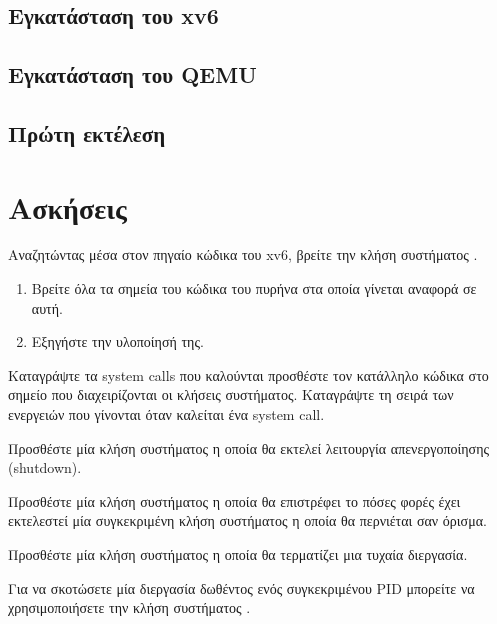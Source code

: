 \documentclass[18pt]{extarticle}
\begin{document}
\subsection{Εγκατάσταση του xv6}

\subsection{Εγκατάσταση του QEMU}

\subsection{Πρώτη εκτέλεση}

\section{Ασκήσεις}

\begin{question}
    Αναζητώντας μέσα στον πηγαίο κώδικα του xv6, βρείτε την 
    κλήση συστήματος .

    \begin{enumerate}
        \item Βρείτε όλα τα σημεία του κώδικα του πυρήνα στα οποία γίνεται αναφορά σε αυτή.
        \item Εξηγήστε την υλοποίησή της.
    \end{enumerate}
\end{question}

\begin{question}
    Καταγράψτε τα system calls που καλούνται προσθέστε τον κατάλληλο κώδικα στο σημείο που 
    διαχειρίζονται οι κλήσεις συστήματος.
    Καταγράψτε τη σειρά των ενεργειών που γίνονται όταν καλείται ένα system call.
\end{question}

\begin{question}
    Προσθέστε μία κλήση συστήματος η οποία θα εκτελεί λειτουργία απενεργοποίησης (shutdown). 
\end{question}

\begin{question}
    Προσθέστε μία κλήση συστήματος η οποία θα επιστρέφει το πόσες φορές έχει εκτελεστεί μία 
    συγκεκριμένη κλήση συστήματος η οποία θα περνιέται σαν όρισμα.
\end{question}

\begin{question}
    Προσθέστε μία κλήση συστήματος η οποία θα τερματίζει μια τυχαία διεργασία.

    \begin{info}[Σημείωση:]
        Για να σκοτώσετε μία διεργασία δωθέντος ενός συγκεκριμένου PID
        μπορείτε να χρησιμοποιήσετε την κλήση συστήματος .
    \end{info}
\end{question}


\printbibliography
\end{document}
